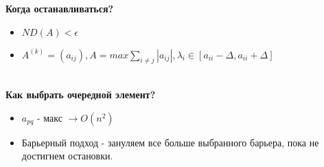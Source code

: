     \textbf{Когда останавливаться?}
    \begin{itemize}
        \item \(ND(A) < \epsilon \)
        \item \(A^{(k)}=(a_{ij}), A = max \sum_{i\neq j}|a_{ij}|, \lambda_i \in [a_{ii}-\Delta, a_{ii} + \Delta]\)
    \end{itemize} \\

    \textbf{Как выбрать очередной элемент?}
    \begin{itemize}
        \item \(a_{pq}\) - макс \(\rightarrow O(n^2)\)
        \item Барьерный подход - зануляем все больше выбранного барьера, пока не достигнем остановки.
    \end{itemize}
